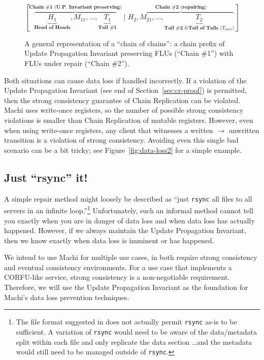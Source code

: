 \documentclass[preprint,10pt]{sigplanconf}
\begin{document}
\begin{figure}
\centering
$
[\overbrace{\underbrace{H_1}_\textbf{Head of Heads}, M_{11},\ldots,
      \underbrace{T_1}_\textbf{Tail \#1}}^\textbf{Chain \#1 (U.P.~Invariant preserving)}
\mid
\overbrace{H_2, M_{21},\ldots,
      \underbrace{T_2}_\textbf{Tail \#2 \& Tail of Tails ($T_{tails}$)}}^\textbf{Chain \#2 (repairing)}
]
$
\caption{A general representation of a ``chain of chains'': a chain prefix of
  Update Propagation Invariant preserving FLUs (``Chain \#1'')
  with FLUs under repair (``Chain \#2'').}
\label{fig:repair-chain-of-chains}
\end{figure}

Both situations can cause data loss if handled incorrectly.
If a violation of the Update Propagation Invariant (see end of
Section~\ref{sec:cr-proof}) is permitted, then the strong consistency
guarantee of Chain Replication can be violated.  Machi uses
write-once registers, so the number of possible strong consistency
violations is smaller than Chain Replication of mutable registers.
However, even when using write-once registers,
any client that witnesses a written $\rightarrow$
unwritten transition is a violation of strong consistency.
Avoiding even this single bad scenario can be a bit tricky; see
Figure~\ref{fig:data-loss2} for a simple example.

\subsection{Just ``rsync'' it!}
\label{ssec:just-rsync-it}

A simple repair method might
loosely be described as ``just {\tt rsync}
all files to all servers in an infinite loop.''\footnote{The
  file format suggested in
  \cite{machi-design} does not actually permit {\tt rsync}
  as-is to be sufficient.  A variation of {\tt rsync} would need to be
  aware of the data/metadata split within each file and only replicate
  the data section \ldots and the metadata would still need to be
  managed outside of {\tt rsync}.}
Unfortunately, such an informal method
cannot tell you exactly when you are in danger of data loss and when
data loss has actually happened.  However, if we always maintain the Update
Propagation Invariant, then we know exactly when data loss is imminent
or has happened.

We intend to use Machi for multiple use cases, in both
require strong consistency and eventual consistency environments.
For a use case that implements a CORFU-like service,
strong consistency is a non-negotiable
requirement.  Therefore, we will use the Update Propagation Invariant
as the foundation for Machi's data loss prevention techniques.
\end{document}
